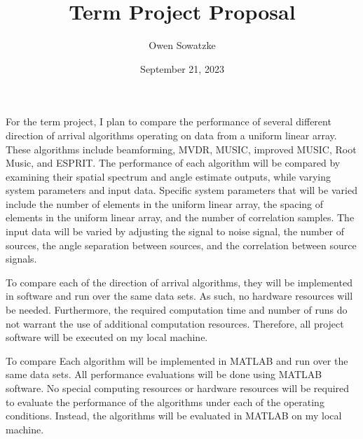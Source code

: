 \documentclass{article}
\title{Term Project Proposal}
\author{Owen Sowatzke}
\date{September 21, 2023}
\begin{document}
	\maketitle

	For the term project, I plan to compare the performance of several different direction of arrival algorithms operating on data from a uniform linear array. These algorithms include beamforming, MVDR, MUSIC, improved MUSIC, Root Music, and ESPRIT. The performance of each algorithm will be compared by examining their spatial spectrum and angle estimate outputs, while varying system parameters and input data. Specific system parameters that will be varied include the number of elements in the uniform linear array, the spacing of elements in the uniform linear array, and the number of correlation samples. The input data will be varied by adjusting the signal to noise signal, the number of sources, the angle separation between sources, and the correlation between source signals.
	
	To compare each of the direction of arrival algorithms, they will be implemented in software and run over the same data sets. As such, no hardware resources will be needed. Furthermore, the required computation time and number of runs do not warrant the use of additional computation resources. Therefore, all project software will be executed on my local machine.
	
	
	
	
	
	To compare Each algorithm will be implemented in MATLAB and run over the same data sets. 
	All performance evaluations will be done using MATLAB software.  No special computing resources or hardware resources will be required to evaluate the performance of the algorithms under each of the operating conditions. Instead, the algorithms will be evaluated in MATLAB on my local machine.
	
\end{document}

